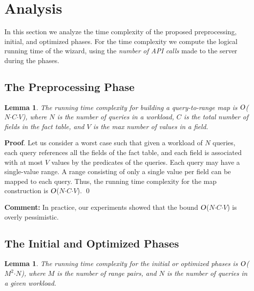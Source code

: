 \documentclass[paper]{ieice}
\newtheorem{lemma}[theorem]{Lemma}
\def\BigO{\mbox{\sl O}}
\begin{document}
\section{Analysis}
\label{sec:analysis}

In this section we analyze the time complexity of 
the proposed preprocessing, initial, and optimized phases.
For the time complexity we compute the logical running time of the wizard, using the {\em number of API calls} 
made to the server during the phases. 


\subsection{The Preprocessing Phase}

\begin{lemma}
\label{lemma:pre_phase}  
The running time complexity for building a query-to-range map is 
$\BigO$($N${$\cdot$}$C${$\cdot$}$V$), where $N$ is the number of queries 
in a workload, $C$ is the total number of fields in the fact table, 
and $V$ is the max number of values in a field. 
\end{lemma}

{\bf Proof}. Let us consider a worst case such that given a workload of 
$N$ queries, each query references all the fields of the fact table, and 
each field is associated with at most $V$ values by the predicates of the queries. 
Each query may have a single-value range. 
A range consisting of only a single value per field can be mapped to each query. 
Thus, the running time complexity for the map construction 
is $\BigO$($N${$\cdot$}$C${$\cdot$}$V$). \qed

{\bf Comment:} In practice, our experiments showed that the bound 
$\BigO$($N${$\cdot$}$C${$\cdot$}$V$) is overly pessimistic. 

\subsection{The Initial and Optimized Phases}

\begin{lemma}
\label{lemma:init_phase}  
The running time complexity for the initial or optimized phases is 
$\BigO$($M^{2}${$\cdot$}$N$), 
where $M$ is the number of range pairs, and $N$ is the number of queries in 
a given workload. 
\end{lemma}
\end{document}
